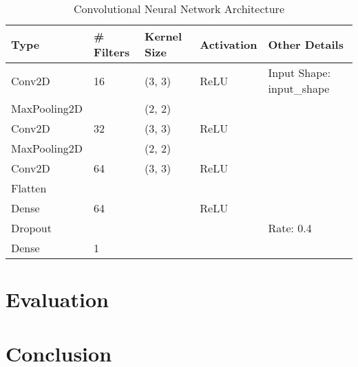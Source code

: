 \documentclass[conference]{article}
\begin{document}
\begin{table}[h]
    \centering
    \begin{tabular}{|l|l|l|l|l|}
    \hline
    Type        & \# Filters & Kernel Size & Activation & Other Details \\ \hline
    Conv2D      & 16         & (3, 3)      & ReLU       & Input Shape: input\_shape \\ \hline
    MaxPooling2D&            & (2, 2)      &            &                     \\ \hline
    Conv2D      & 32         & (3, 3)      & ReLU       &                     \\ \hline
    MaxPooling2D&            & (2, 2)      &            &                     \\ \hline
    Conv2D      & 64         & (3, 3)      & ReLU       &                     \\ \hline
    Flatten     &            &             &            &                     \\ \hline
    Dense       & 64         &             & ReLU       &                     \\ \hline
    Dropout     &            &             &            & Rate: 0.4           \\ \hline
    Dense       & 1          &             &            &                     \\
    \hline
    \end{tabular}
    \caption{Convolutional Neural Network Architecture}
    \label{tab:model_layers}
\end{table}

\section{Evaluation}


\section{Conclusion}
\end{document}
